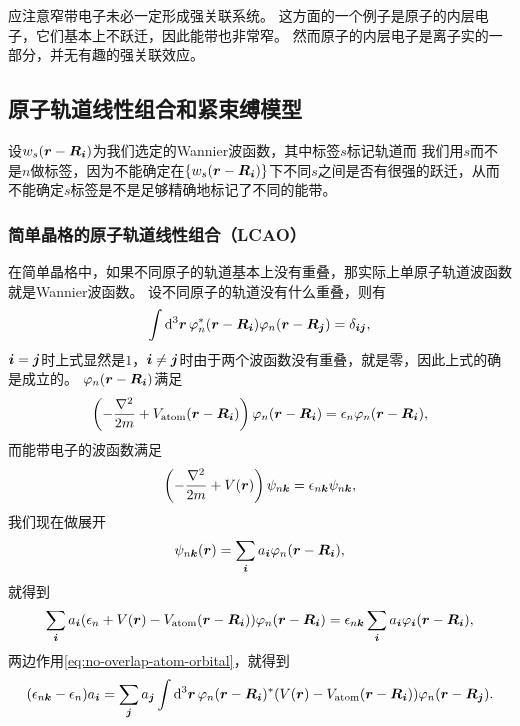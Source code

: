应注意窄带电子未必一定形成强关联系统。
这方面的一个例子是原子的内层电子，它们基本上不跃迁，因此能带也非常窄。
然而原子的内层电子是离子实的一部分，并无有趣的强关联效应。

\subsection{原子轨道线性组合和紧束缚模型}\label{sec:tight-binding-hopping}

设$w_{s}(\vb*{r} - \vb*{R}_{\vb*{i}})$为我们选定的Wannier波函数，其中标签$s$标记轨道而
我们用$s$而不是$n$做标签，因为不能确定在$\{w_{s}(\vb*{r} - \vb*{R}_{\vb*{i}})\}$下不同$s$之间是否有很强的跃迁，从而不能确定$s$标签是不是足够精确地标记了不同的能带。

\subsubsection{简单晶格的原子轨道线性组合（LCAO）} 

在简单晶格中，如果不同原子的轨道基本上没有重叠，那实际上单原子轨道波函数就是Wannier波函数。
设不同原子的轨道没有什么重叠，则有
\begin{equation}
    \int \dd[3]{\vb*{r}} \varphi_n^*(\vb*{r} - \vb*{R}_{\vb*{i}}) \varphi_n(\vb*{r} - \vb*{R}_{\vb*{j}}) = \delta_{\vb*{i} \vb*{j}},
    \label{eq:no-overlap-atom-orbital}
\end{equation}
$\vb*{i}=\vb*{j}$时上式显然是$1$，$\vb*{i} \neq \vb*{j}$时由于两个波函数没有重叠，就是零，因此上式的确是成立的。
$\varphi_n(\vb*{r} - \vb*{R}_{\vb*{i}})$满足
\begin{equation}
    \left( - \frac{\laplacian}{2m} + V_\text{atom} (\vb*{r} - \vb*{R}_{\vb*{i}}) \right) \varphi_n(\vb*{r} - \vb*{R}_{\vb*{i}}) = \epsilon_n \varphi_n(\vb*{r} - \vb*{R}_{\vb*{i}}),
\end{equation}
而能带电子的波函数满足
\begin{equation}
    \left( - \frac{\laplacian}{2m} + V (\vb*{r}) \right) \psi_{n \vb*{k}} = \epsilon_{n \vb*{k}} \psi_{n \vb*{k}},
\end{equation}
我们现在做展开
\begin{equation}
    \psi_{n \vb*{k}}(\vb*{r}) = \sum_{\vb*{i}} a_{\vb*{i}} \varphi_n(\vb*{r} - \vb*{R}_{\vb*{i}}),
\end{equation}
就得到
\[
    \sum_{\vb*{i}} a_{\vb*{i}} (\epsilon_n + V(\vb*{r}) - V_\text{atom}(\vb*{r} - \vb*{R}_{\vb*{i}})) \varphi_n(\vb*{r} - \vb*{R}_{\vb*{i}}) = \epsilon_{n \vb*{k}} \sum_{\vb*{i}} a_{\vb*{i}} \varphi_{\vb*{i}}(\vb*{r} - \vb*{R}_{\vb*{i}}),
\]
两边作用\eqref{eq:no-overlap-atom-orbital}，就得到
\begin{equation}
    (\epsilon_{n \vb*{k}} - \epsilon_n) a_{\vb*{i}} = \sum_{\vb*{j}} a_{\vb*{j}} \int \dd[3]{\vb*{r}} \varphi_n(\vb*{r} - \vb*{R}_{\vb*{i}})^* ( V(\vb*{r}) - V_\text{atom}(\vb*{r} - \vb*{R}_{\vb*{i}})) \varphi_n(\vb*{r} - \vb*{R}_{\vb*{j}}).
\end{equation}

